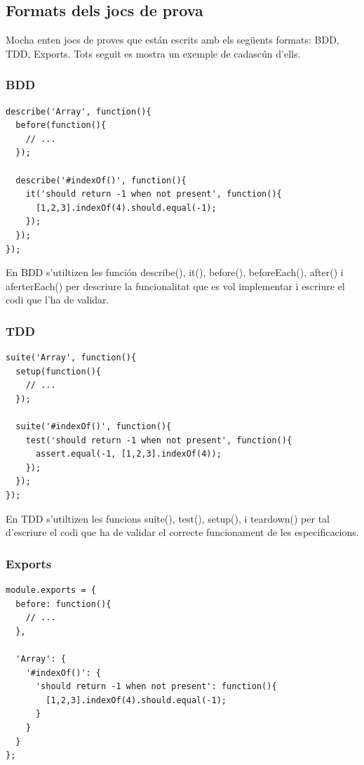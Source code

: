 \subsection{Formats dels jocs de prova}
\label{sec:format-jocs-prova}
Mocha enten jocs de proves que están escrits amb els següents formats: BDD, TDD, Exports. Tots seguit es mostra un exemple de cadascún d'ells. 

\subsubsection{BDD}
\begin{lstlisting}
describe('Array', function(){
  before(function(){
    // ...
  });

  describe('#indexOf()', function(){
    it('should return -1 when not present', function(){
      [1,2,3].indexOf(4).should.equal(-1);
    });
  });
});
\end{lstlisting}

En BDD s'utiltizen les función describe(), it(), before(), beforeEach(), after() i aferterEach() per descriure la funcionalitat que es vol implementar i escriure el codi que l'ha de validar.

\subsubsection{TDD}
\begin{lstlisting}
suite('Array', function(){
  setup(function(){
    // ...
  });

  suite('#indexOf()', function(){
    test('should return -1 when not present', function(){
      assert.equal(-1, [1,2,3].indexOf(4));
    });
  });
});

\end{lstlisting}

En TDD s'utiltizen les funcions suite(), test(), setup(), i teardown() per tal d'escriure el codi que ha de validar el correcte funcionament de les especificacions.

\subsubsection{Exports}
\begin{lstlisting}
module.exports = {
  before: function(){
    // ...
  },

  'Array': {
    '#indexOf()': {
      'should return -1 when not present': function(){
        [1,2,3].indexOf(4).should.equal(-1);
      }
    }
  }
};

\end{lstlisting}

